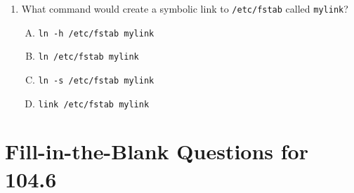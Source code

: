 \documentclass[a4paper]{report}
\begin{document}
\begin{enumerate}[1.]
    \item What command would create a symbolic link to \texttt{/etc/fstab} called \texttt{mylink}?  
    \begin{enumerate}[A)]
        \item \texttt{ln -h /etc/fstab mylink}  
        \item \texttt{ln /etc/fstab mylink}  
        \item \texttt{ln -s /etc/fstab mylink}  
        \item \texttt{link /etc/fstab mylink}  
    \end{enumerate}

\end{enumerate}


\newpage
\section*{Fill-in-the-Blank Questions for 104.6}
\end{document}
